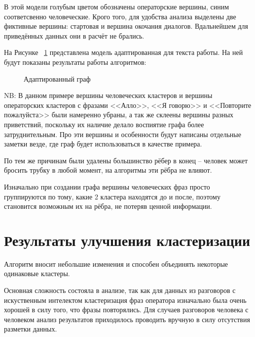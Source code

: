 \documentclass[times,specification,annotation]{itmo-student-thesis}
\begin{document}
	В этой модели голубым цветом обозначены операторские вершины, синим соответсвенно человеческие. Крого того, для удобства анализа выделены две фиктивные вершины: стартовая и вершина окочания диалогов. Вдальнейшем для приведённых данных они в расчёт не брались.
	
	На Рисунке ~\ref{fig:graph:adapt} представлена модель адаптированная для текста работы. На ней будут показаны результаты работы алгоритмов:
	
	\begin{figure}[H]
		\caption{Адаптированный граф}
		\label{fig:graph:adapt}
	\end{figure}

	NB: В данном примере вершины человеческих кластеров и вершины операторских кластеров с фразами <<Алло>>, <<Я говорю>> и <<Повторите пожалуйста>> были намеренно убраны, а так же склеены вершины разных приветствий, поскольку их наличие делало воспиятие графа более затруднительным. Про эти вершины и особенности будут написаны отдельные заметки везде, где граф будет использоваться в качестве примера.
	
	По тем же причинам были удалены большинство рёбер в конец -- человек может бросить трубку в любой момент, на алгоритмы эти рёбра не влияют.
	
	Изначально при создании графа вершины человеческих фраз просто группируются по тому, какие 2 кластера находятся до и после, поэтому становится возможным их на рёбра, не потеряв ценной информации.
	
	\section{Результаты улучшения кластеризации}
	Алгоритм вносит небольшие изменения и способен объединять некоторые одинаковые кластеры. 
	
	Основная сложность состояла в анализе, так как для данных из разговоров с искуственным интелектом кластеризация фраз оператора изначально была очень хорошей в силу того, что фразы повторялись. Для случаев разговоров человека с человеком анализ результатов приходилось проводить вручную в силу отсутствия разметки данных.
	
\end{document}

